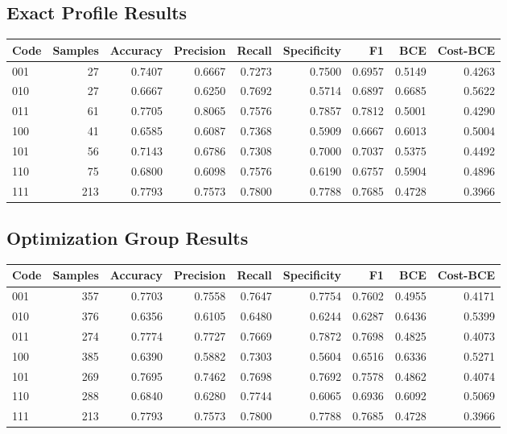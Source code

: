 \documentclass[11pt]{article}
\begin{document}
\subsection*{Exact Profile Results}
\begin{center}
\begin{tabular}{lrrrrrrrr}
\toprule
Code & Samples & Accuracy & Precision & Recall & Specificity & F1 & BCE & Cost-BCE \\
\midrule
001 & 27 & 0.7407 & 0.6667 & 0.7273 & 0.7500 & 0.6957 & 0.5149 & 0.4263 \\
010 & 27 & 0.6667 & 0.6250 & 0.7692 & 0.5714 & 0.6897 & 0.6685 & 0.5622 \\
011 & 61 & 0.7705 & 0.8065 & 0.7576 & 0.7857 & 0.7812 & 0.5001 & 0.4290 \\
100 & 41 & 0.6585 & 0.6087 & 0.7368 & 0.5909 & 0.6667 & 0.6013 & 0.5004 \\
101 & 56 & 0.7143 & 0.6786 & 0.7308 & 0.7000 & 0.7037 & 0.5375 & 0.4492 \\
110 & 75 & 0.6800 & 0.6098 & 0.7576 & 0.6190 & 0.6757 & 0.5904 & 0.4896 \\
111 & 213 & 0.7793 & 0.7573 & 0.7800 & 0.7788 & 0.7685 & 0.4728 & 0.3966 \\
\bottomrule
\end{tabular}
\end{center}

\subsection*{Optimization Group Results}
\begin{center}
\begin{tabular}{lrrrrrrrr}
\toprule
Code & Samples & Accuracy & Precision & Recall & Specificity & F1 & BCE & Cost-BCE \\
\midrule
001 & 357 & 0.7703 & 0.7558 & 0.7647 & 0.7754 & 0.7602 & 0.4955 & 0.4171 \\
010 & 376 & 0.6356 & 0.6105 & 0.6480 & 0.6244 & 0.6287 & 0.6436 & 0.5399 \\
011 & 274 & 0.7774 & 0.7727 & 0.7669 & 0.7872 & 0.7698 & 0.4825 & 0.4073 \\
100 & 385 & 0.6390 & 0.5882 & 0.7303 & 0.5604 & 0.6516 & 0.6336 & 0.5271 \\
101 & 269 & 0.7695 & 0.7462 & 0.7698 & 0.7692 & 0.7578 & 0.4862 & 0.4074 \\
110 & 288 & 0.6840 & 0.6280 & 0.7744 & 0.6065 & 0.6936 & 0.6092 & 0.5069 \\
111 & 213 & 0.7793 & 0.7573 & 0.7800 & 0.7788 & 0.7685 & 0.4728 & 0.3966 \\
\bottomrule
\end{tabular}
\end{center}
\end{document}
